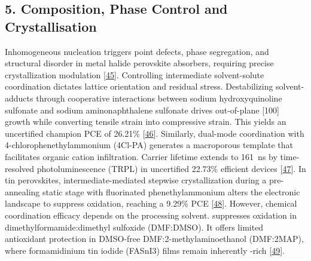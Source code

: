 \documentclass[
  11pt,
]{article}
\begin{document}
\subsection{5. Composition, Phase Control and
Crystallisation}\label{composition-phase-control-and-crystallisation}

Inhomogeneous nucleation triggers point defects, phase segregation, and
structural disorder in metal halide perovskite absorbers, requiring
precise crystallization modulation
{[}\href{https://doi.org/10.1002/adma.74388}{45}{]}. Controlling
intermediate solvent-solute coordination dictates lattice orientation
and residual stress. Destabilizing solvent- adducts through
cooperative interactions between sodium hydroxyquinoline sulfonate and
sodium aminonaphthalene sulfonate drives out-of-plane {[}100{]} growth
while converting tensile strain into compressive strain. This yields an
uncertified champion PCE of 26.21\%
{[}\href{https://doi.org/10.1002/aenm.71474}{46}{]}. Similarly,
dual-mode coordination with 4-chlorophenethylammonium (4Cl-PA) generates
a macroporous  template that facilitates organic cation
infiltration. Carrier lifetime extends to \qty{161}{\nano\second} by
time-resolved photoluminescence (TRPL) in uncertified 22.73\% efficient
devices {[}\href{https://doi.org/10.1016/j.jcis.2026.141449}{47}{]}. In
tin perovskites, intermediate-mediated stepwise crystallization during a
pre-annealing static stage with fluorinated phenethylammonium alters the
 electronic landscape to suppress  oxidation,
reaching a 9.29\% PCE
{[}\href{https://doi.org/10.1021/acsami.6c11057}{48}{]}. However,
chemical coordination efficacy depends on the processing solvent.
 suppresses  oxidation in dimethylformamide:dimethyl
sulfoxide (DMF:DMSO). It offers limited antioxidant protection in
DMSO-free DMF:2-methylaminoethanol (DMF:2MAP), where formamidinium tin
iodide (FASnI3) films remain inherently -rich
{[}\href{https://doi.org/10.1021/acsaem.6c02063}{49}{]}.
\end{document}
